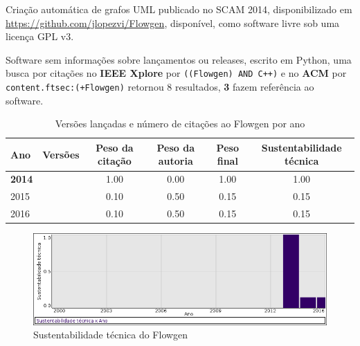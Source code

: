 Criação automática de grafos UML
publicado no SCAM 2014,
disponibilizado em \url{https://github.com/jlopezvi/Flowgen},
disponível,
como software livre
sob uma licença GPL v3.

Software sem informações sobre lançamentos ou releases,
escrito em Python,
uma busca por citações no {\bf IEEE Xplore} por
\texttt{((Flowgen) AND C++)}
e no {\bf ACM} por
\texttt{content.ftsec:(+Flowgen)}
retornou
8 resultados,
{\bf 3} fazem referência ao software.


\begin{table}[H]
\caption{Versões lançadas e número de citações ao Flowgen por ano}
\centering
\begin{tabular}{| l | c | c | c | c | c |}
  \hline
  Ano & Versões & Peso da citação & Peso da autoria & Peso final & Sustentabilidade técnica \\
  \hline
            {\bf 2014}
          &
          
          &
          1.00
          &
          0.00
          &
          1.00
          &
            {\color{blue} 1.00}
          \\
\hline
            2015
          &
          
          &
          0.10
          &
          0.50
          &
          0.15
          &
            {\color{red} 0.15}
          \\
\hline
            2016
          &
          
          &
          0.10
          &
          0.50
          &
          0.15
          &
            {\color{red} 0.15}
          \\
\hline
\end{tabular}
\end{table}

\begin{figure}[h]
  \center
  \includegraphics[scale=0.50]{imagens/softwares-charts/flowgen.png}
  \caption{Sustentabilidade técnica do Flowgen}
\end{figure}


